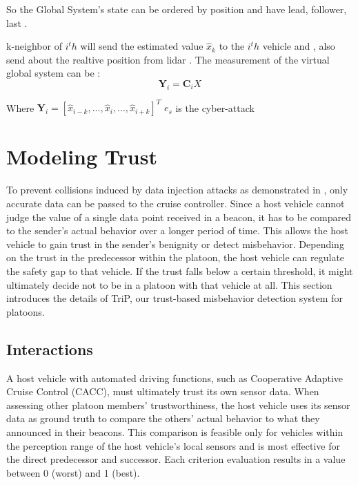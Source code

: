 \documentclass[letterpaper, 10pt, conference]{ieeeconf}  %
\begin{document}
So the Global System's state can be ordered by position and have lead, follower, last . 



k-neighbor of $i^th$ will send the estimated value $\hat{x}_k $ to the $i^th$ vehicle and , also send about the realtive position from lidar . The measurement of the virtual global system can be :
\begin{equation*}\label{CACC}
      \mathbf{Y}_i = \mathbf{C}_i X    
\end{equation*}  

Where $\mathbf{Y}_i = [\hat{x}_{i-k} ,..., \hat{x}_{i},..., \hat{x}_{i+k} ]^T$  
$e_s$ is the cyber-attack  




\section{Modeling Trust}

To prevent collisions induced by data injection attacks as demonstrated in \cite{vanderheijden2017}, only accurate data can be passed to the cruise controller. Since a host vehicle cannot judge the value of a single data point received in a beacon, it has to be compared to the sender's actual behavior over a longer period of time. This allows the host vehicle to gain trust in the sender's benignity or detect misbehavior. Depending on the trust in the predecessor within the platoon, the host vehicle can regulate the safety gap to that vehicle. If the trust falls below a certain threshold, it might ultimately decide not to be in a platoon with that vehicle at all. This section introduces the details of TriP, our trust-based misbehavior detection system for platoons.

\subsection{Interactions}

A host vehicle with automated driving functions, such as Cooperative Adaptive Cruise Control (CACC), must ultimately trust its own sensor data. When assessing other platoon members' trustworthiness, the host vehicle uses its sensor data as ground truth to compare the others' actual behavior to what they announced in their beacons. This comparison is feasible only for vehicles within the perception range of the host vehicle’s local sensors and is most effective for the direct predecessor and successor. Each criterion evaluation results in a value between 0 (worst) and 1 (best).
\end{document}
